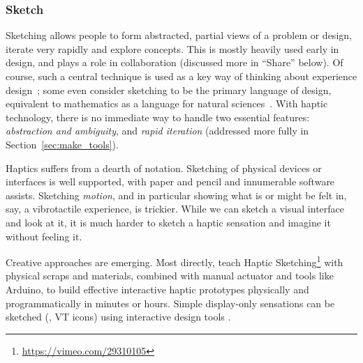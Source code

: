 %
%
\subsubsection{Sketch}
\label{sec:make_DP_sketch}
Sketching allows people to form abstracted, partial views of a problem or design, iterate very rapidly and explore concepts.
This is mostly heavily used early in design, and plays a role in collaboration (discussed more in ``Share'' below).
Of course, such a central technique is used as a key way of thinking about experience design~\cite{Buxton2007}; 
some even consider sketching to be the primary language of design, equivalent to mathematics as a language for natural sciences~\cite{Cross2006}.
With haptic technology, there is no immediate way to handle two essential features: \textit{abstraction and ambiguity}, and \textit{rapid iteration} (addressed more fully in Section~\ref{sec:make_tools}).

	Haptics suffers from a dearth of notation.
	Sketching of physical devices or interfaces is well supported, with paper and pencil and innumerable software assists.
	Sketching \textit{motion}, and in particular showing what is or might be felt in, say, a vibrotactile experience, is  trickier.
	While we can sketch a visual interface and look at it, it is much harder to sketch a haptic sensation and imagine it without feeling it.

Creative approaches are emerging.
Most directly, \citet{Moussette2011} teach Haptic Sketching\footnote{\url{https://vimeo.com/29310105}} with physical scraps and materials, combined with manual actuator and tools like Arduino, to build effective interactive haptic prototypes physically and programmatically  in minutes or hours.
Simple display-only sensations can be sketched (\eg, VT icons)  using interactive design tools \cite{schneider2014improvising,Hong2013}.



%
%
